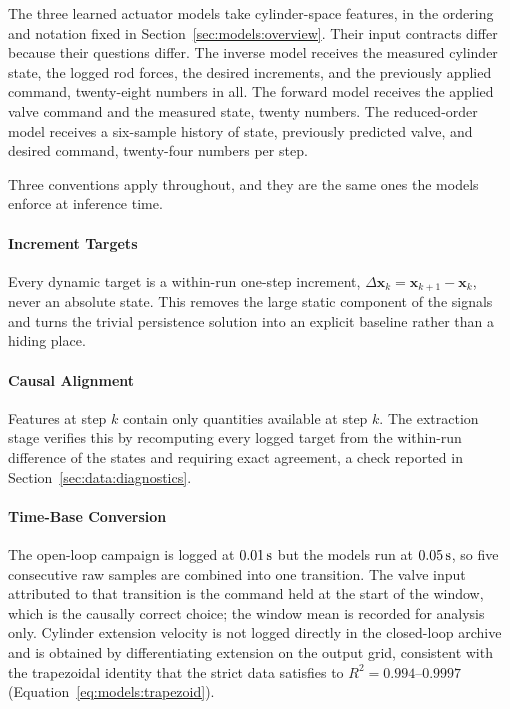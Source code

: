 The three learned actuator models take cylinder-space features, in the
ordering and notation fixed in Section~\ref{sec:models:overview}. Their
input contracts differ because their questions differ. The inverse model
receives the measured cylinder state, the logged rod forces, the desired
increments, and the previously applied command, twenty-eight numbers in
all. The forward model receives the applied valve command and the
measured state, twenty numbers. The reduced-order model receives a
six-sample history of state, previously predicted valve, and desired
command, twenty-four numbers per step.

Three conventions apply throughout, and they are the same ones the models
enforce at inference time.

\paragraph{Increment Targets}
Every dynamic target is a within-run one-step increment,
$\Delta \bm{x}_k = \bm{x}_{k+1} - \bm{x}_k$, never an absolute state. This
removes the large static component of the signals and turns the trivial
persistence solution into an explicit baseline rather than a hiding place.

\paragraph{Causal Alignment}
Features at step $k$ contain only quantities available at step $k$. The
extraction stage verifies this by recomputing every logged target from
the within-run difference of the states and requiring exact agreement,
a check reported in Section~\ref{sec:data:diagnostics}.

\paragraph{Time-Base Conversion}
The open-loop campaign is logged at $\unit[0.01]{s}$ but the models run at
$\unit[0.05]{s}$, so five consecutive raw samples are combined into one
transition. The valve input attributed to that transition is the command held at
the start of the window, which is the causally correct choice; the window mean is
recorded for analysis only. Cylinder extension velocity is not logged directly
in the closed-loop archive and is obtained by differentiating extension on the
output grid, consistent with the trapezoidal identity that the strict data
satisfies to $R^2 = 0.994$--$0.9997$ (Equation~\ref{eq:models:trapezoid}).


